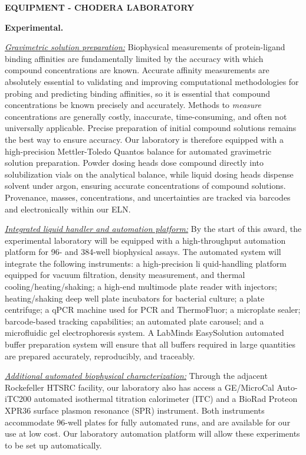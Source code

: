 \documentclass[11pt]{article}
\begin{document}

{\bf EQUIPMENT - CHODERA LABORATORY}

{\bf Experimental.}


\underline{\emph{Gravimetric solution preparation:}}
Biophysical measurements of protein-ligand binding affinities are fundamentally limited by the accuracy with which compound concentrations are known.  
Accurate affinity measurements are absolutely essential to validating and improving computational methodologies for probing and predicting binding affinities, so it is essential that compound concentrations be known precisely and accurately.
Methods to \emph{measure} concentrations are generally costly, inaccurate, time-consuming, and often not universally applicable.  Precise preparation of initial compound solutions remains the best way to ensure accuracy.  
Our laboratory is therefore equipped with a high-precision Mettler-Toledo Quantos balance for automated gravimetric solution preparation.
Powder dosing heads dose compound directly into solubilization vials on the analytical balance, while liquid dosing heads dispense solvent under argon, ensuring accurate concentrations of compound solutions.
Provenance, masses, concentrations, and uncertainties are tracked via barcodes and electronically within our ELN.

\underline{\emph{Integrated liquid handler and automation platform:}}
By the start of this award, the experimental laboratory will be equipped with a high-throughput automation platform for 96- and 384-well biophysical assays.
The automated system will integrate the following instruments: a high-precision li quid-handling platform equipped for vacuum filtration, density measurement, and thermal cooling/heating/shaking; a high-end multimode plate reader with injectors; heating/shaking deep well plate incubators for bacterial culture; a plate centrifuge; a qPCR machine used for PCR and ThermoFluor; a microplate sealer; barcode-based tracking capabilities; an automated plate carousel; and a microfluidic gel electrophoresis system.
A LabMinds EasySolution automated buffer preparation system will ensure that all buffers required in large quantities are prepared accurately, reproducibly, and traceably.

\underline{\emph{Additional automated biophysical characterization:}}
Through the adjacent Rockefeller HTSRC facility, our laboratory also has access a GE/MicroCal Auto-iTC200 automated isothermal titration calorimeter (ITC) and a BioRad Proteon XPR36 surface plasmon resonance (SPR) instrument.  Both instruments accommodate 96-well plates for fully automated runs, and are available for our use at low cost.
Our laboratory automation platform will allow these experiments to be set up automatically.
\end{document}

